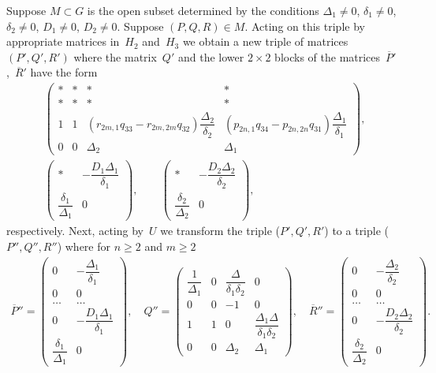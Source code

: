 \documentclass[12pt]{amsart}
\theoremstyle{definition}
\theoremstyle{remark}
\begin{document}
Suppose $M\subset G$ is the open subset determined by the conditions
$\Delta_1\ne0$, $\delta_1\ne0$, $\delta_2\ne0$, $D_1 \ne 0$, $D_2
\ne 0$. Suppose $(P,Q,R)\in M$. Acting on this triple by appropriate
matrices in~$H_2$ and~$H_3$ we obtain a new triple of matrices
$(P',Q',R')$ where the matrix~$Q'$ and the lower $2\times 2$ blocks
of the matrices~$\overline P{}'$,~$\overline R{}'$ have the form
\begin{gather*}
\begin{pmatrix}
* & * & * & *
\\
* & * & * & *
\\
1 & 1 & (r_{2m,1}q_{33}-r_{2m,2m}q_{32})\dfrac{\Delta_2}{\delta_2} &
(p_{2n,1}q_{34}-p_{2n,2n}q_{31})\dfrac{\Delta_1}{\delta_1}
\\
0 & 0 & \Delta_2 & \Delta_1
\end{pmatrix},
\\[2mm]
\begin{pmatrix}
* & -\dfrac{D_1\Delta_1}{\delta_1}
\\
\dfrac{\delta_1}{\Delta_1} & 0
\end{pmatrix},\qquad
\begin{pmatrix}
* & -\dfrac{D_2\Delta_2}{\delta_2}
\\
\dfrac{\delta_2}{\Delta_2} & 0
\end{pmatrix},
\end{gather*}
respectively. Next, acting by~$U$ we transform the triple
($P',Q',R'$) to a triple ($P'',Q'',R''$) where for $n{\geqslant}2$ and
$m{\geqslant}2$
\begin{gather*}
\overline P{}''=\begin{pmatrix} 0 & -\dfrac{\Delta_1}{\delta_1}
\\
0 & 0
\\
\hdots & \hdots
\\
0 & -\dfrac{D_1\Delta_1}{\delta_1}
\\
\dfrac{\delta_1}{\Delta_1} & 0
\end{pmatrix},\quad
Q''=\begin{pmatrix} \dfrac{1}{\Delta_1} & 0 &
\dfrac{\Delta}{\delta_1\delta_2} & 0
\\
0 & 0 & -1 & 0
\\
1 & 1 & 0 & \dfrac{\Delta_1\Delta}{\delta_1\delta_2}
\\
0 & 0 & \Delta_2 & \Delta_1
\end{pmatrix},\quad
\overline R{}''=\begin{pmatrix} 0 & -\dfrac{\Delta_2}{\delta_2}
\\
0 & 0
\\
\hdots & \hdots
\\
0 & -\dfrac{D_2\Delta_2}{\delta_2}
\\
\dfrac{\delta_2}{\Delta_2} & 0
\end{pmatrix}.
\end{gather*}
\end{document}
